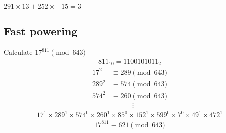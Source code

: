 \documentclass{article}
\begin{document}
\begin{multicols*}{2}
$291 \times 13 + 252 \times -15 = 3$

\subsection*{Fast powering}
Calculate $17^{811} \pmod{643}$
\begin{align*}
    811_{10} = 1100101011_2
\end{align*}
\begin{align*}
    17^2 &\equiv 289 \pmod{643} \\
    289^2 &\equiv 574 \pmod{643} \\
    574^2 &\equiv 260 \pmod{643} \\
    & \qquad \quad \vdots
\end{align*}
\begin{align*}
    17^{1} \times 289^{1} \times 574^{0} \times 260^{1} \times 85^{0} \times 152^{1} \times 599^{0} \times 7^{0} \times 49^{1} \times 472^{1}
\end{align*}
\begin{align*}
    17^{811} \equiv 621 \pmod{643}
\end{align*}

\end{multicols*}
\pagebreak
\end{document}
